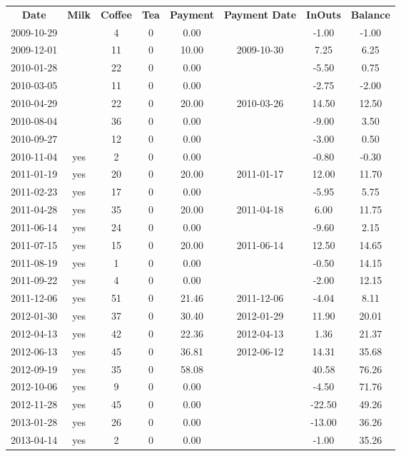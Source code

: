 \begin{center}
\begin{tabular}{cccccccc}
\textbf{Date} & \textbf{Milk} & \textbf{Coffee} & \textbf{Tea} & \textbf{Payment} & \textbf{Payment Date} & \textbf{InOuts} & \textbf{Balance} \\
2009-10-29 &  &  4 & 0 &  0.00 &  &  -1.00 & -1.00\\ 
2009-12-01 &  & 11 & 0 & 10.00 & 2009-10-30 &   7.25 &  6.25\\ 
2010-01-28 &  & 22 & 0 &  0.00 &  &  -5.50 &  0.75\\ 
2010-03-05 &  & 11 & 0 &  0.00 &  &  -2.75 & -2.00\\ 
2010-04-29 &  & 22 & 0 & 20.00 & 2010-03-26 &  14.50 & 12.50\\ 
2010-08-04 &  & 36 & 0 &  0.00 &  &  -9.00 &  3.50\\ 
2010-09-27 &  & 12 & 0 &  0.00 &  &  -3.00 &  0.50\\ 
2010-11-04 & yes &  2 & 0 &  0.00 &  &  -0.80 & -0.30\\ 
2011-01-19 & yes & 20 & 0 & 20.00 & 2011-01-17 &  12.00 & 11.70\\ 
2011-02-23 & yes & 17 & 0 &  0.00 &  &  -5.95 &  5.75\\ 
2011-04-28 & yes & 35 & 0 & 20.00 & 2011-04-18 &   6.00 & 11.75\\ 
2011-06-14 & yes & 24 & 0 &  0.00 &  &  -9.60 &  2.15\\ 
2011-07-15 & yes & 15 & 0 & 20.00 & 2011-06-14 &  12.50 & 14.65\\ 
2011-08-19 & yes &  1 & 0 &  0.00 &  &  -0.50 & 14.15\\ 
2011-09-22 & yes &  4 & 0 &  0.00 &  &  -2.00 & 12.15\\ 
2011-12-06 & yes & 51 & 0 & 21.46 & 2011-12-06 &  -4.04 &  8.11\\ 
2012-01-30 & yes & 37 & 0 & 30.40 & 2012-01-29 &  11.90 & 20.01\\ 
2012-04-13 & yes & 42 & 0 & 22.36 & 2012-04-13 &   1.36 & 21.37\\ 
2012-06-13 & yes & 45 & 0 & 36.81 & 2012-06-12 &  14.31 & 35.68\\ 
2012-09-19 & yes & 35 & 0 & 58.08 &  &  40.58 & 76.26\\ 
2012-10-06 & yes &  9 & 0 &  0.00 &  &  -4.50 & 71.76\\ 
2012-11-28 & yes & 45 & 0 &  0.00 &  & -22.50 & 49.26\\ 
2013-01-28 & yes & 26 & 0 &  0.00 &  & -13.00 & 36.26\\ 
2013-04-14 & yes &  2 & 0 &  0.00 &  &  -1.00 & 35.26
\end{tabular}
\end{center}

